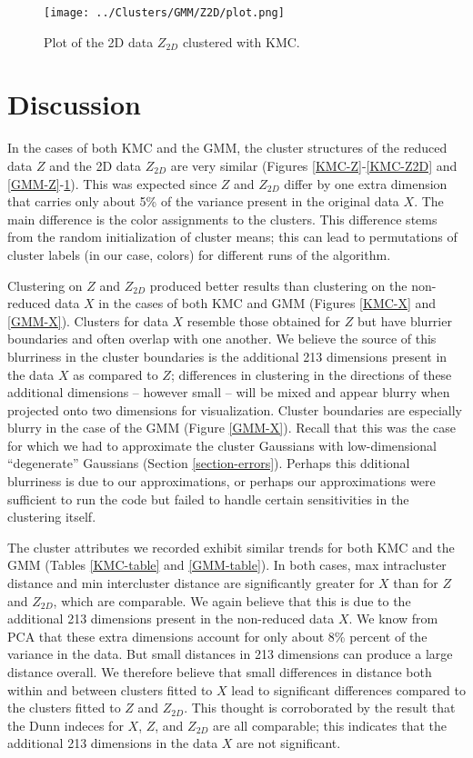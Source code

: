 \documentclass[12pt]{article}
\begin{document}
\begin{figure}
\centering
\texttt{[image: ../Clusters/GMM/Z2D/plot.png]}
\caption{\label{GMM-Z2D} Plot of the 2D data $Z_{2D}$ clustered with KMC.}
\end{figure}


\section{Discussion}

In the cases of both KMC and the GMM, the cluster structures of the reduced data $Z$ and the 2D data $Z_{2D}$ are very similar (Figures \ref{KMC-Z}-\ref{KMC-Z2D} and \ref{GMM-Z}-\ref{GMM-Z2D}). This was expected since $Z$ and $Z_{2D}$ differ by one extra dimension that carries only about 5\% of the variance present in the original data $X$. The main difference is the color assignments to the clusters. This difference stems from the random initialization of cluster means; this can lead to permutations of cluster labels (in our case, colors) for different runs of the algorithm.

Clustering on $Z$ and $Z_{2D}$ produced better results than clustering on the non-reduced data $X$ in the cases of both KMC and GMM (Figures \ref{KMC-X} and \ref{GMM-X}). Clusters for data $X$ resemble those obtained for $Z$ but have blurrier boundaries and often overlap with one another. We believe the source of this blurriness in the cluster boundaries is the additional 213 dimensions present in the data $X$ as compared to $Z$; differences in clustering in the directions of these additional dimensions -- however small -- will be mixed and appear blurry when projected onto two dimensions for visualization. Cluster boundaries are especially blurry in the case of the GMM (Figure \ref{GMM-X}). Recall that this was the case for which we had to approximate the cluster Gaussians with low-dimensional ``degenerate'' Gaussians (Section \ref{section-errors}). Perhaps this dditional blurriness is due to our approximations, or perhaps our approximations were sufficient to run the code but failed to handle certain sensitivities in the clustering itself.

The cluster attributes we recorded exhibit similar trends for both KMC and the GMM (Tables \ref{KMC-table} and \ref{GMM-table}). In both cases, max intracluster distance and min intercluster distance are significantly greater for $X$ than for $Z$ and $Z_{2D}$, which are comparable. We again believe that this is due to the additional 213 dimensions present in the non-reduced data $X$. We know from PCA that these extra dimensions account for only about 8\% percent of the variance in the data. But small distances in 213 dimensions can produce a large distance overall. We therefore believe that small differences in distance both within and between clusters fitted to $X$ lead to significant differences compared to the clusters fitted to $Z$ and $Z_{2D}$. This thought is corroborated by the result that the Dunn indeces for $X$, $Z$, and $Z_{2D}$ are all comparable; this indicates that the additional 213 dimensions in the data $X$ are not significant.
\end{document}
